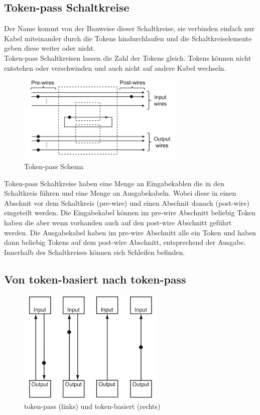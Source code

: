 \documentclass[11pt,a4paper]{article}
\begin{document}

\subsection{Token-pass Schaltkreise}
Der Name kommt von der Bauweise dieser Schaltkreise, sie verbinden einfach nur
Kabel miteinander durch die Tokens hindurchlaufen und die Schaltkreiselemente
geben diese weiter oder nicht. \\
%
Token-pass Schaltkreisen lassen die Zahl der Tokens gleich.
%
Tokens können nicht entstehen oder verschwinden und auch 
nicht auf andere Kabel wechseln.

\begin{figure}[h]
    \centering
    \includegraphics[width=8cm]{bilder/TokenPassScheme.png}
    \caption{Token-pass Schema}
    \label{fig:tokenPassScheme}
\end{figure} 


Token-pass Schaltkreise haben eine Menge an Eingabekablen die in
den Schaltkreis führen und eine Menge an Ausgabekabeln.
%
Wobei diese in einen Abschnit vor dem Schaltkreis (pre-wire) und einen Abschnit
danach (post-wire) eingeteilt werden.
%
Die Eingabekabel können im pre-wire Abschnitt beliebig Token haben die aber 
wenn vorhanden auch auf den post-wire Abschnitt geführt werden.
%
Die Ausgabekabel haben im pre-wire Abschnitt alle ein Token und haben dann
beliebig Tokens auf dem post-wire Abschnitt, entsprechend der Ausgabe.
%
Innerhalb des Schaltkreises können sich Schleifen befinden. 


\subsection{Von token-basiert nach token-pass}

\begin{figure}[h]
    \centering
    \includegraphics[width=7cm]{bilder/basedToPass.png}
    \caption{token-pass (links) und token-basiert (rechts)}
\end{figure}
\end{document}
